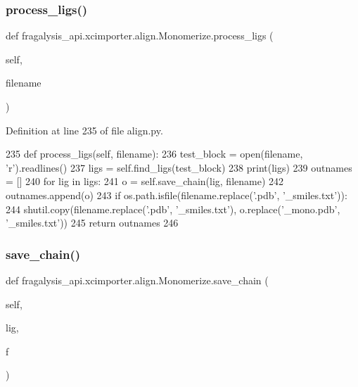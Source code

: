 \subsubsection{\texorpdfstring{process\+\_\+ligs()}{process\_ligs()}}
{\footnotesize\ttfamily def fragalysis\+\_\+api.\+xcimporter.\+align.\+Monomerize.\+process\+\_\+ligs (\begin{DoxyParamCaption}\item[{}]{self,  }\item[{}]{filename }\end{DoxyParamCaption})}



Definition at line 235 of file align.\+py.


\begin{DoxyCode}
235     \textcolor{keyword}{def }process\_ligs(self, filename):
236         test\_block = open(filename, \textcolor{stringliteral}{'r').readlines()}
237 \textcolor{stringliteral}{        ligs = self.find\_ligs(test\_block)}
238 \textcolor{stringliteral}{        print(ligs)}
239 \textcolor{stringliteral}{        outnames = []}
240 \textcolor{stringliteral}{        }\textcolor{keywordflow}{for} lig \textcolor{keywordflow}{in} ligs:
241             o = self.save\_chain(lig, filename)
242             outnames.append(o)
243             \textcolor{keywordflow}{if} os.path.isfile(filename.replace(\textcolor{stringliteral}{'.pdb'}, \textcolor{stringliteral}{'\_smiles.txt'})):
244                 shutil.copy(filename.replace(\textcolor{stringliteral}{'.pdb'}, \textcolor{stringliteral}{'\_smiles.txt'}), o.replace(\textcolor{stringliteral}{'\_mono.pdb'}, \textcolor{stringliteral}{'\_smiles.txt'}))
245         \textcolor{keywordflow}{return} outnames
246 
\end{DoxyCode}
\mbox{\label{classfragalysis__api_1_1xcimporter_1_1align_1_1_monomerize_a7dc86cd770a6c7532e96b0f45d91dc2b}} 
\subsubsection{\texorpdfstring{save\+\_\+chain()}{save\_chain()}}
{\footnotesize\ttfamily def fragalysis\+\_\+api.\+xcimporter.\+align.\+Monomerize.\+save\+\_\+chain (\begin{DoxyParamCaption}\item[{}]{self,  }\item[{}]{lig,  }\item[{}]{f }\end{DoxyParamCaption})}



